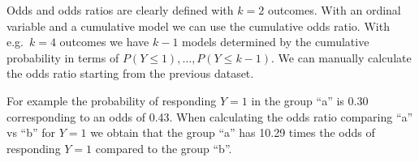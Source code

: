 \documentclass[
  man,floatsintext]{apa6}
\newenvironment{Shaded}{\begin{snugshade}}{\end{snugshade}}
\newcommand{\CommentTok}[1]{\textcolor[rgb]{0.56,0.35,0.01}{\textit{#1}}}
\newcommand{\ControlFlowTok}[1]{\textcolor[rgb]{0.13,0.29,0.53}{\textbf{#1}}}
\newcommand{\DecValTok}[1]{\textcolor[rgb]{0.00,0.00,0.81}{#1}}
\newcommand{\DocumentationTok}[1]{\textcolor[rgb]{0.56,0.35,0.01}{\textbf{\textit{#1}}}}
\newcommand{\FunctionTok}[1]{\textcolor[rgb]{0.13,0.29,0.53}{\textbf{#1}}}
\newcommand{\NormalTok}[1]{#1}
\newcommand{\OtherTok}[1]{\textcolor[rgb]{0.56,0.35,0.01}{#1}}
\newcommand{\SpecialCharTok}[1]{\textcolor[rgb]{0.81,0.36,0.00}{\textbf{#1}}}
\newcommand{\StringTok}[1]{\textcolor[rgb]{0.31,0.60,0.02}{#1}}
\begin{document}
\normalsize

Odds and odds ratios are clearly defined with \(k = 2\) outcomes. With an ordinal variable and a cumulative model we can use the cumulative odds ratio. With e.g.~\(k = 4\) outcomes we have \(k - 1\) models determined by the cumulative probability in terms of \(P(Y \leq 1), \dots, P(Y \leq k - 1)\). We can manually calculate the odds ratio starting from the previous dataset.

\scriptsize

\begin{Shaded}
\end{Shaded}

\normalsize

For example the probability of responding \(Y = 1\) in the group ``a'' is 0.30 corresponding to an odds of 0.43. When calculating the odds ratio comparing ``a'' vs ``b'' for \(Y = 1\) we obtain that the group ``a'' has 10.29 times the odds of responding \(Y = 1\) compared to the group ``b''.
\end{document}
